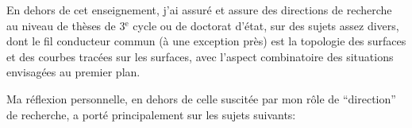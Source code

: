 En dehors de cet enseignement,  j'ai assuré et assure des directions de
recherche au niveau de thèses de 3$^{\text{e}}$ cycle ou de doctorat d'état,  sur des
sujets assez divers, dont le fil conducteur commun (à une exception près)
est la topologie des surfaces\xout{,} et des courbes tracées sur les surfaces,
avec l'aspect combinatoire des situations envisagées au premier plan.

Ma réflexion personnelle,  en dehors de celle suscitée par mon rôle de
``direction'' de recherche, a porté principalement sur les sujets suivants:

